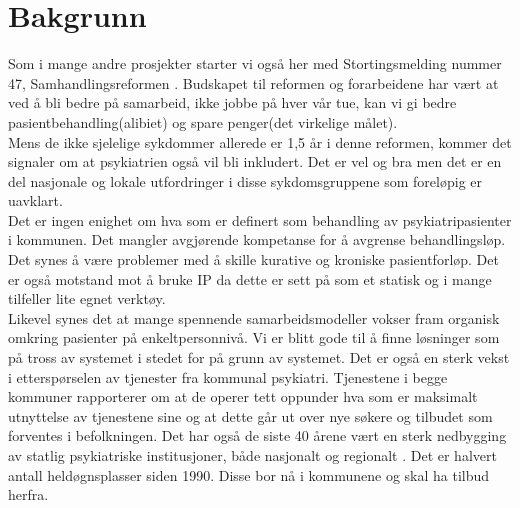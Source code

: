 \documentclass[11pt]{report} %
\begin{document}
                \section{Bakgrunn}\label{sec:ov_bakg}
                  Som i mange andre prosjekter starter vi også her med Stortingsmelding nummer 47, Samhandlingsreformen
                  \cite{Stmld47}. Budskapet til reformen og forarbeidene har vært at ved å bli bedre på samarbeid, ikke jobbe på hver vår tue, kan vi gi bedre pasientbehandling(alibiet) og spare penger(det virkelige målet). \\
                  Mens de ikke sjelelige sykdommer allerede er 1,5 år i denne reformen, kommer det signaler om at psykiatrien også vil bli inkludert. Det er vel og bra men det er en del nasjonale og lokale utfordringer i disse sykdomsgruppene som foreløpig er uavklart. \\
                  Det er ingen enighet om hva som er definert som behandling av psykiatripasienter i kommunen. Det mangler avgjørende kompetanse for å avgrense behandlingsløp. Det synes å være problemer med å skille kurative og kroniske pasientforløp. Det er også motstand mot å bruke IP da dette er sett på som et statisk og i mange tilfeller lite egnet verktøy. \\

                  Likevel synes det at mange spennende samarbeidsmodeller vokser fram organisk omkring pasienter på enkeltpersonnivå. Vi er blitt gode til å finne løsninger som på tross av systemet i stedet for på grunn av systemet.
                  Det er også en sterk vekst i etterspørselen av tjenester fra kommunal psykiatri. Tjenestene i begge kommuner rapporterer om at de operer tett oppunder hva som er maksimalt utnyttelse av tjenestene sine og at dette går ut over nye søkere og tilbudet som forventes i befolkningen.
                  Det har også de siste 40 årene vært en sterk nedbygging av statlig psykiatriske institusjoner, både nasjonalt og regionalt
                  \cite{SSButtrekk1}. Det er halvert antall heldøgnsplasser siden 1990. Disse bor nå i kommunene og skal ha tilbud herfra. 
\end{document}

